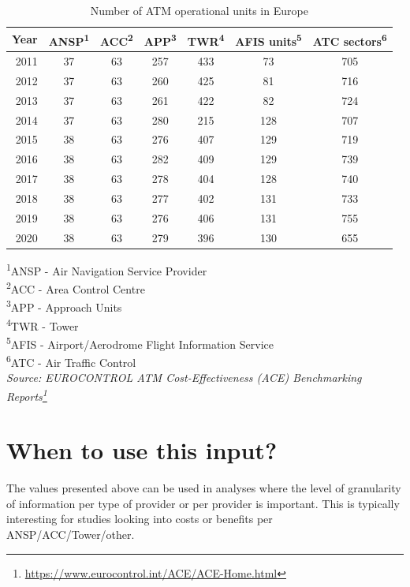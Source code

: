 \documentclass[
  11pt,
  a4paper,
]{book}
\DeclareRobustCommand{\href}[2]{#2\footnote{\url{#1}}}
\begin{document}
\hypertarget{tbl-atm-op-units}{}
\setlength{\LTpost}{0mm}
\begin{longtable}{rcccccc}
\caption{\label{tbl-atm-op-units}Number of ATM operational units in Europe }\tabularnewline

\toprule
Year & ANSP\textsuperscript{1} & ACC\textsuperscript{2} & APP\textsuperscript{3} & TWR\textsuperscript{4} & AFIS units\textsuperscript{5} & ATC sectors\textsuperscript{6} \\ 
\midrule
2011 & 37 & 63 & 257 & 433 & 73 & 705 \\ 
2012 & 37 & 63 & 260 & 425 & 81 & 716 \\ 
2013 & 37 & 63 & 261 & 422 & 82 & 724 \\ 
2014 & 37 & 63 & 280 & 215 & 128 & 707 \\ 
2015 & 38 & 63 & 276 & 407 & 129 & 719 \\ 
2016 & 38 & 63 & 282 & 409 & 129 & 739 \\ 
2017 & 38 & 63 & 278 & 404 & 128 & 740 \\ 
2018 & 38 & 63 & 277 & 402 & 131 & 733 \\ 
2019 & 38 & 63 & 276 & 406 & 131 & 755 \\ 
2020 & 38 & 63 & 279 & 396 & 130 & 655 \\ 
\bottomrule
\end{longtable}
\begin{minipage}{\linewidth}
\textsuperscript{1}ANSP - Air Navigation Service Provider\\
\textsuperscript{2}ACC - Area Control Centre\\
\textsuperscript{3}APP - Approach Units\\
\textsuperscript{4}TWR - Tower\\
\textsuperscript{5}AFIS - Airport/Aerodrome Flight Information Service\\
\textsuperscript{6}ATC - Air Traffic Control\\
\emph{Source: \href{https://www.eurocontrol.int/ACE/ACE-Home.html}{EUROCONTROL ATM Cost-Effectiveness (ACE) Benchmarking Reports}}\\
\end{minipage}

\hypertarget{when-to-use-this-input}{%
\section{When to use this input?}\label{when-to-use-this-input}}

The values presented above can be used in analyses where the level of
granularity of information per type of provider or per provider is
important. This is typically interesting for studies looking into costs
or benefits per ANSP/ACC/Tower/other.
\end{document}
